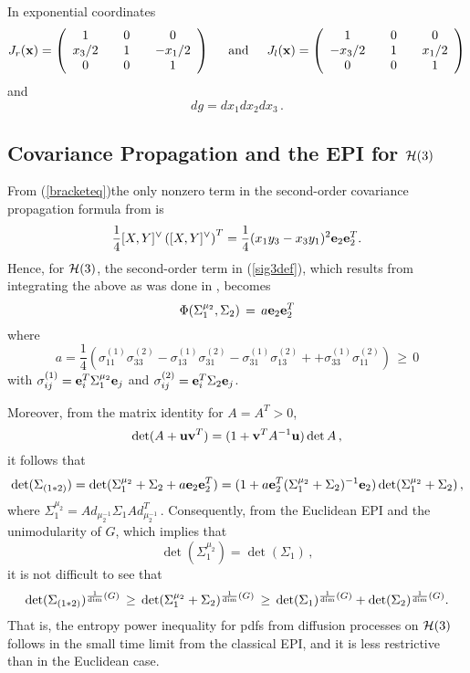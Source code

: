 \documentclass{svmult}
\def\htab{ {\hskip 0.1 true in} }
\newcommand{\ba}{\left(\begin{array}}
\newcommand{\ea}{\end{array}\right)}
\newcommand{\beq}{ \begin{equation}}
\newcommand{\eeq}{ \end{equation} }
\newcommand{\xx}{{\bf x}}
\begin{document}
In exponential coordinates
\beq
J_r(\xx) = \ba{ccccc}
1 & &   0 & &   0 \\
x_3/2 & &   1 & &   -x_1/2 \\
0 & &   0 & &   1
\ea \htab\htab {\rm and} \htab\htab
J_{l}(\xx) = \ba{ccccc}
1 & &   0 & &   0 \\
-x_3/2 & &   1 & &   x_1/2 \\
0 & &   0 & &   1
\ea
\label{expheis}
\eeq
and
$$ dg = dx_1 dx_2 dx_3 \,. $$

\subsection{Covariance Propagation and the EPI for ${\cal H}(3)$}

From (\ref{bracketeq})the only nonzero term in the second-order covariance propagation formula from \cite{wangprop2,dover}  is
$$ \frac{1}{4} [X,Y]^{\vee} \left([X,Y]^{\vee}\right)^T =
\frac{1}{4} (x_1 y_3 - x_3 y_1)^2 {\bf e}_2 {\bf e}_2^T. $$
Hence, for ${\cal H}(3)$, the second-order term in (\ref{sig3def}), which results from integrating the above
as was done in \cite{wangprop2}, becomes
$$ \Phi(\Sigma_1^{\mu_2} , \Sigma_2) \,=\, a {\bf e}_2 {\bf e}_2^T $$
where
$$ a = \frac{1}{4}\left(\sigma_{11}^{(1)} \sigma_{33}^{(2)} -
\sigma_{13}^{(1)} \sigma_{31}^{(2)} -
\sigma_{31}^{(1)} \sigma_{13}^{(2)} +
+ \sigma_{33}^{(1)} \sigma_{11}^{(2)}
\right) \,\geq\,0 $$
with $\sigma_{ij}^{(1)} = {\bf e}_i^T {\Sigma}_1^{\mu_2} {\bf e}_j$ and
$\sigma_{ij}^{(2)} = {\bf e}_i^T {\Sigma}_2 {\bf e}_j$.

Moreover, from the matrix identity for $A=A^T>0$,
$$ \det(A + {\bf u}{\bf v}^T) = (1 + {\bf v}^T A^{-1} {\bf u}) \det A\,, $$
it follows that
$$
\det(\Sigma_{(1*2)}) =
 \det(\Sigma_1^{\mu_2} + {\Sigma}_2  + a {\bf e}_2 {\bf e}_2^T) = (1 + a {\bf e}_2^T (\Sigma_1^{\mu_2} + {\Sigma}_2)^{-1} {\bf e}_2) \det(\Sigma_1^{\mu_2} + {\Sigma}_2)\,, $$
where ${\Sigma}_1^{\mu_2} = Ad_{\mu_{2}^{-1}} \Sigma_1 Ad_{\mu_{2}^{-1}}^T$\,.
Consequently, from the Euclidean EPI and the unimodularity of $G$, which implies that
$$ \det({\Sigma}_1^{\mu_2}) = \det({\Sigma}_1)\,, $$
it is not difficult to see that
$$
\det(\Sigma_{(1*2)})^{\frac{1}{\rm dim}(G)} \,\geq\, \det(\Sigma_1^{\mu_2} + {\Sigma}_2)^{\frac{1}{\rm dim}(G)} \,\geq\,
\det(\Sigma_1)^{\frac{1}{\rm dim}(G)} + \det({\Sigma}_2)^{\frac{1}{\rm dim}(G)}. $$
That is, the entropy power inequality for pdfs from diffusion processes on ${\cal H}(3)$ follows
in the small time limit from the classical EPI, and it is less restrictive than in
the Euclidean case.
\end{document}

